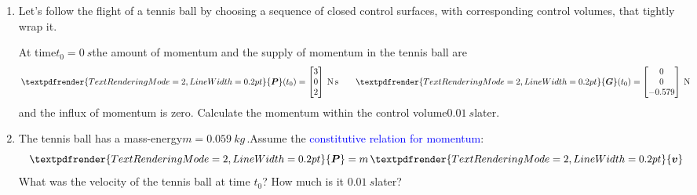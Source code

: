 \documentclass[a4paper,12pt,%
onecolumn,oneside,%
british%
]{memoir}
\renewcommand*{\bm}[1]{\textpdfrender{TextRenderingMode=2,LineWidth=0.2pt}{\boldsymbol{#1}}}
\renewcommand*{\|}[1][]{\nonscript\:#1\vert\nonscript\:\mathopen{}}
\newcommand*{\sect}{\S}%
\renewcommand*{\autoref}[2]{\sidepar{\vspace{-1ex}\footnotesize{\color{blue}\faIcon{%
angle-right%
}\enspace\sect~\ref{#1} page~\pageref{#1}}}\textcolor{blue}{#2}}
\newcommand*{\masse}{mass-energy}
\newcommand*{\yv}{\bm{v}}
\newcommand*{\yti}{t_{0}}
\newcommand*{\yM}{m}%
\newcommand*{\yP}{\bm{P}}
\newcommand*{\yG}{\bm{G}}
\begin{document}
\begin{exercise}[label={ex:tennisball}]
  \begin{enumerate}[exerc]
  \item Let's follow the flight of a tennis ball by choosing a sequence of closed control surfaces, with corresponding control volumes, that tightly wrap it.

    At time\enspace$\yti=\qty{0}{s}$\enspace the amount of momentum and the supply of momentum in the tennis ball are
    \begin{equation*}
      \yP(\yti) =
      \begin{bmatrix}
        3\\0\\2
      \end{bmatrix}\:\unit{N\,s}
      \qquad
      \yG(\yti) =
      \begin{bmatrix}
        0\\0\\-0.579
      \end{bmatrix}\:\unit{N}
    \end{equation*}
    and the influx of momentum is zero. Calculate the momentum within the control volume\enspace$\qty{0.01}{s}$\enspace later.

  \item The tennis ball has a \masse\enspace$\yM = \qty{0.059}{kg}$\,.\enspace Assume the \autoref{item:momentum_mass_velocity}{constitutive relation for momentum}:
    \begin{equation*}
      \yP = \yM\,\yv
    \end{equation*}
    What was the velocity of the tennis ball at time $\yti$? How much is it \enspace$\qty{0.01}{s}$\enspace later?
  \end{enumerate}
\end{exercise}
%
\end{document}
